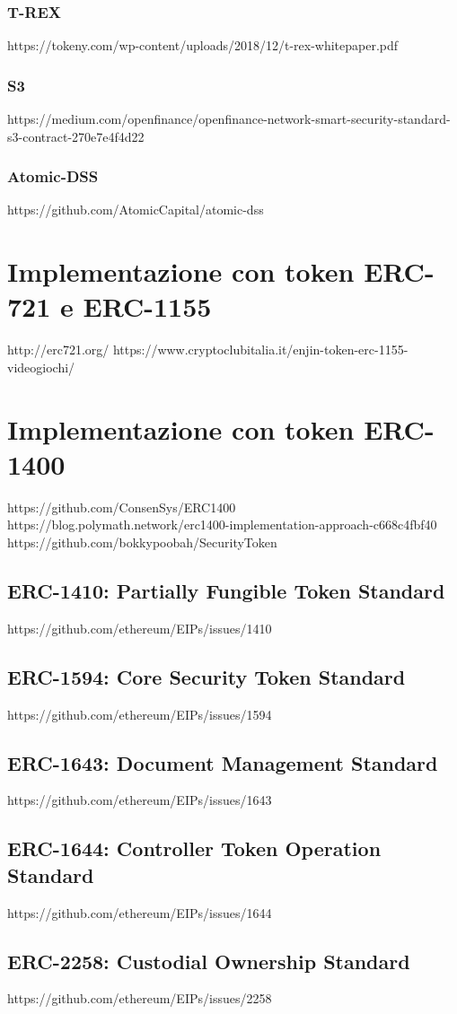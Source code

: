 \subsubsection{T-REX}
https://tokeny.com/wp-content/uploads/2018/12/t-rex-whitepaper.pdf
\subsubsection{S3}
https://medium.com/openfinance/openfinance-network-smart-security-standard-s3-contract-270e7e4f4d22
\subsubsection{Atomic-DSS}
https://github.com/AtomicCapital/atomic-dss

\section{Implementazione con token ERC-721 e ERC-1155}
http://erc721.org/
https://www.cryptoclubitalia.it/enjin-token-erc-1155-videogiochi/
\section{Implementazione con token ERC-1400}
https://github.com/ConsenSys/ERC1400
https://blog.polymath.network/erc1400-implementation-approach-c668c4fbf40
https://github.com/bokkypoobah/SecurityToken
\subsection{ERC-1410: Partially Fungible Token Standard}
https://github.com/ethereum/EIPs/issues/1410
\subsection{ERC-1594: Core Security Token Standard}
https://github.com/ethereum/EIPs/issues/1594
\subsection{ERC-1643: Document Management Standard}
https://github.com/ethereum/EIPs/issues/1643
\subsection{ERC-1644: Controller Token Operation Standard}
https://github.com/ethereum/EIPs/issues/1644
\subsection{ERC-2258: Custodial Ownership Standard}
https://github.com/ethereum/EIPs/issues/2258
